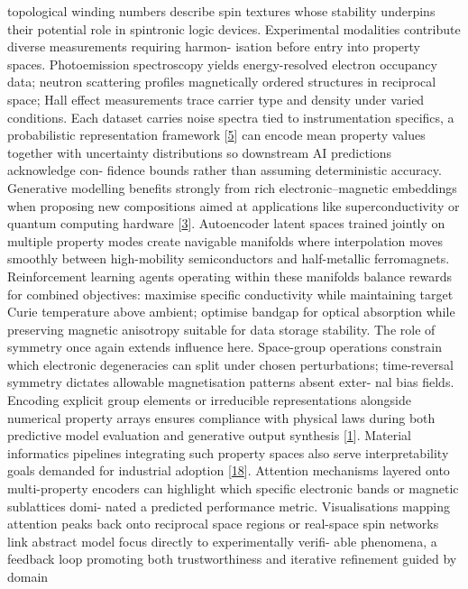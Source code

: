\documentclass[
]{article}
\begin{document}
topological winding numbers describe spin textures whose stability
underpins their potential role in spintronic logic devices. Experimental
modalities contribute diverse measurements requiring harmon- isation
before entry into property spaces. Photoemission spectroscopy yields
energy-resolved electron occupancy data; neutron scattering profiles
magnetically ordered structures in reciprocal space; Hall effect
measurements trace carrier type and density under varied conditions.
Each dataset carries noise spectra tied to instrumentation specifics, a
probabilistic representation framework
{[}\protect\hyperlink{_bookmark45}{5}{]} can encode mean property values
together with uncertainty distributions so downstream AI predictions
acknowledge con- fidence bounds rather than assuming deterministic
accuracy. Generative modelling benefits strongly from rich
electronic--magnetic embeddings when proposing new compositions aimed at
applications like superconductivity or quantum computing hardware
{[}\protect\hyperlink{_bookmark43}{3}{]}. Autoencoder latent spaces
trained jointly on multiple property modes create navigable manifolds
where interpolation moves smoothly between high-mobility semiconductors
and half-metallic ferromagnets. Reinforcement learning agents operating
within these manifolds balance rewards for combined objectives: maximise
specific conductivity while maintaining target Curie temperature above
ambient; optimise bandgap for optical absorption while preserving
magnetic anisotropy suitable for data storage stability. The role of
symmetry once again extends influence here. Space-group operations
constrain which electronic degeneracies can split under chosen
perturbations; time-reversal symmetry dictates allowable magnetisation
patterns absent exter- nal bias fields. Encoding explicit group elements
or irreducible representations alongside numerical property arrays
ensures compliance with physical laws during both predictive model
evaluation and generative output synthesis
{[}\protect\hyperlink{_bookmark41}{1}{]}. Material informatics pipelines
integrating such property spaces also serve interpretability goals
demanded for industrial adoption
{[}\protect\hyperlink{_bookmark58}{18}{]}. Attention mechanisms layered
onto multi-property encoders can highlight which specific electronic
bands or magnetic sublattices domi- nated a predicted performance
metric. Visualisations mapping attention peaks back onto reciprocal
space regions or real-space spin networks link abstract model focus
directly to experimentally verifi- able phenomena, a feedback loop
promoting both trustworthiness and iterative refinement guided by domain
\end{document}
